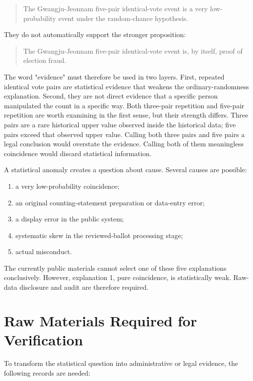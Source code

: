 \documentclass[preprint]{IEIE}
\begin{document}
\begin{quote}
The Gwangju-Jeonnam five-pair identical-vote event is a very low-probability event under the random-chance hypothesis.
\end{quote}

They do not automatically support the stronger proposition:

\begin{quote}
The Gwangju-Jeonnam five-pair identical-vote event is, by itself, proof of election fraud.
\end{quote}

The word "evidence" must therefore be used in two layers. First, repeated identical vote pairs are statistical evidence that weakens the ordinary-randomness explanation. Second, they are not direct evidence that a specific person manipulated the count in a specific way. Both three-pair repetition and five-pair repetition are worth examining in the first sense, but their strength differs. Three pairs are a rare historical upper value observed inside the historical data; five pairs exceed that observed upper value. Calling both three pairs and five pairs a legal conclusion would overstate the evidence. Calling both of them meaningless coincidence would discard statistical information.

A statistical anomaly creates a question about cause. Several causes are possible:

\begin{enumerate}
\item a very low-probability coincidence;
\item an original counting-statement preparation or data-entry error;
\item a display error in the public system;
\item systematic skew in the reviewed-ballot processing stage;
\item actual misconduct.
\end{enumerate}

The currently public materials cannot select one of these five explanations conclusively. However, explanation 1, pure coincidence, is statistically weak. Raw-data disclosure and audit are therefore required.

\section{Raw Materials Required for Verification}

To transform the statistical question into administrative or legal evidence, the following records are needed:
\end{document}
